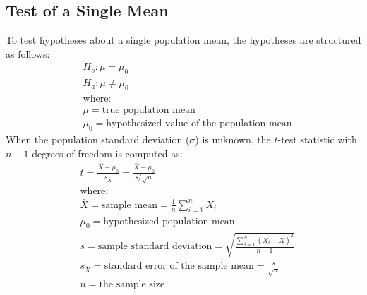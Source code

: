 \subsection{Test of a Single Mean}
To test hypotheses about a single population mean, the hypotheses are structured as follows:
\begin{align*}
	 & H_o: \mu = \mu_0                                                    \\
	 & H_a: \mu \neq \mu_0                                                 \\
	 & \text{where:}                                                       \\
	 & \mu = \text{true population mean}                                  \\
	 & \mu_0 = \text{hypothesized value of the population mean}
\end{align*}
When the population standard deviation ($\sigma$) is unknown, the $t$-test statistic with $n - 1$ degrees of freedom is computed as:
\begin{align*}
	 & t = \frac{\bar{X} - \mu_0}{s_{\bar{X}}} = \frac{\bar{X} - \mu_0}{s / \sqrt{n}}                         \\
	 & \text{where:}                                                                                         \\
	 & \bar{X} = \text{sample mean} = \frac{1}{n}\sum_{i=1}^{n} X_i                                           \\
	 & \mu_0 = \text{hypothesized population mean}                                                           \\
	 & s = \text{sample standard deviation} = \sqrt{\frac{\displaystyle\sum_{i=1}^{n}(X_i-\bar{X})^2}{n-1}} \\
	 & s_{\bar{X}} = \text{standard error of the sample mean} = \frac{s}{\sqrt{n}}                            \\
	 & n = \text{the sample size}
\end{align*}
